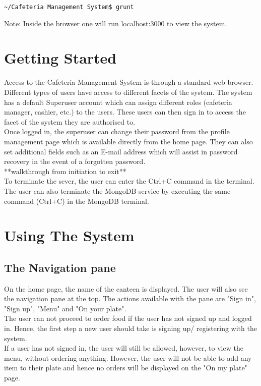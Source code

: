 \documentclass[12pt]{article}
\begin{document}
\begin{verbatim}
~/Cafeteria Management System$ grunt
\end{verbatim}

Note: Inside the browser one will run localhost:3000 to view the system.

\section{Getting Started}
Access to the Cafeteria Management System is through a standard web browser. Different types of users have access to different facets of the system. The system has a default Superuser account which can assign different roles (cafeteria manager, cashier, etc.) to the users. These users can then sign in to access the facet of the system they are authorised to.\\
Once logged in, the superuser can change their password from the profile management page which is available directly from the home page. They can also set additional fields such as an E-mail address which will assist in password recovery in the event of a forgotten password.\\
**walkthrough from initiation to exit**\\
To terminate the sever, the user can enter the Ctrl+C command in the terminal. The user can also terminate the MongoDB service by executing the same command (Ctrl+C) in the MongoDB terminal.

\section{Using The System} 
\subsection{The Navigation pane} 
On the home page, the name of the canteen is displayed. The user will also see the navigation pane at the top. The actions available with the pane are "Sign in", "Sign up", "Menu" and "On your plate". 
\\
The user can not proceed to order food if the user has not signed up and logged in. Hence, the first step a new user should take is signing up/ registering with the system. 
\\
If a user has not signed in, the user will still be allowed, however, to view the menu, without ordering anything. However, the user will not be able to add any item to their plate and hence no orders will be displayed on the "On my plate" page.
\end{document}
